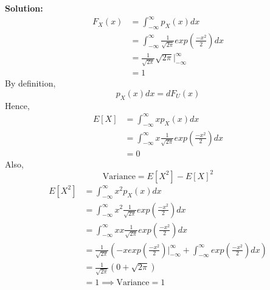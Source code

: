 \documentclass[journal,12pt,twocolumn]{IEEEtran}
\renewcommand\thesection{\arabic{section}}
\begin{document}
\begin{enumerate}[label=\thesection.\arabic*
,ref=\thesection.\theenumi]
\textbf{Solution:}
\begin{align}
    F_X(x)&=\int_{-\infty}^{\infty} p_X(x) dx\\
    &=\int_{-\infty}^{\infty} \frac{1}{\sqrt{2\pi}}exp(\frac{-x^2}{2}) dx\\
    &=\frac{1}{\sqrt{2\pi}} \sqrt{2\pi}\Big|_{-\infty}^{\infty}\\
    &=1
\end{align}
By definition,
\begin{equation}
    p_X(x) dx=dF_U(x)
\end{equation}
Hence,
\begin{align}
    E[X]&=\int_{-\infty}^{\infty} x p_X(x) dx\\
       &=\int_{-\infty}^{\infty} x \frac{1}{\sqrt{2\pi}}exp(\frac{-x^2}{2}) dx\\
       &=0
\end{align}
Also,
\begin{equation}
\text{Variance}=E[X^2]-{{E[X]}^2}
\end{equation}
\begin{align}
    E[X^2]&=\int_{-\infty}^{\infty} x^2 p_X(x) dx\\
          &=\int_{-\infty}^{\infty} x^2 \frac{1}{\sqrt{2\pi}}exp(\frac{-x^2}{2}) dx\\
          &=\int_{-\infty}^{\infty} x x\frac{1}{\sqrt{2\pi}}exp(\frac{-x^2}{2}) dx\\
          &=\frac{1}{\sqrt{2\pi}}(-x exp(\frac{-x^2}{2})\Big|_{-\infty}^{\infty} +\int_{-\infty}^{\infty} exp(\frac{-x^2}{2})dx)\\
          &=\frac{1}{\sqrt{2\pi}}(0 +\sqrt{2\pi})\\
          &=1
\implies\text{Variance}=1
\end{align}
%
\end{enumerate}
\end{document}
